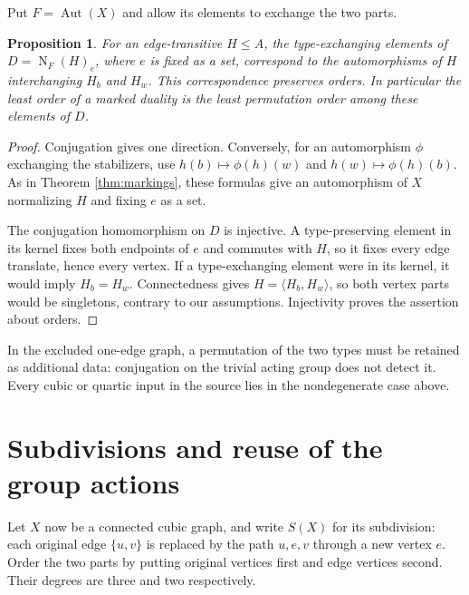 \documentclass[11pt]{article}
\newtheorem{proposition}[theorem]{Proposition}
\theoremstyle{definition}\newtheorem{definition}[theorem]{Definition}
\newcommand{\Aut}{\operatorname{Aut}}
\newcommand{\N}{\operatorname{N}}
\begin{document}
Put $F=\Aut(X)$ and allow its elements to exchange the two parts.
\begin{proposition}\label{prop:duality}
For an edge-transitive $H\le A$, the type-exchanging elements of
$D=\N_F(H)_e$, where $e$ is fixed as a set, correspond to the
automorphisms of $H$ interchanging $H_b$ and $H_w$.  This correspondence
preserves orders.  In particular the least order of a marked duality
is the least permutation order among these elements of $D$.
\end{proposition}
\begin{proof}
Conjugation gives one direction.  Conversely, for an automorphism
$\phi$ exchanging the stabilizers, use
$h(b)\mapsto\phi(h)(w)$ and $h(w)\mapsto\phi(h)(b)$.
As in Theorem \ref{thm:markings}, these formulas give an automorphism
of $X$ normalizing $H$ and fixing $e$ as a set.

The conjugation homomorphism on $D$ is injective.  A type-preserving
element in its kernel fixes both endpoints of $e$ and commutes with
$H$, so it fixes every edge translate, hence every vertex.  If a
type-exchanging element were in its kernel, it would imply
$H_b=H_w$.  Connectedness gives $H=\langle H_b,H_w\rangle$, so
both vertex parts would be singletons, contrary to our assumptions.
Injectivity proves the assertion about orders.
\end{proof}

In the excluded one-edge graph, a permutation of the two types
must be retained as additional data: conjugation on the trivial
acting group does not detect it.  Every cubic or quartic input in
the source lies in the nondegenerate case above.

\section{Subdivisions and reuse of the group actions}
Let $X$ now be a connected cubic graph, and write $S(X)$ for its
subdivision: each original edge $\{u,v\}$ is replaced by the path
$u,e,v$ through a new vertex $e$.  Order the two parts by putting
original vertices first and edge vertices second.  Their degrees are
three and two respectively.
\end{document}
